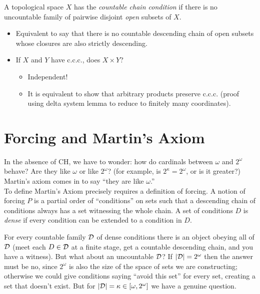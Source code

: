\documentclass{amsart}
\begin{document}
	A topological space $X$ has the \textit{countable chain condition} if there is no uncountable family of pairwise disjoint \textit{open} subsets of $X$.
	
	\begin{itemize}
		\item Equivalent to say that there is no countable descending chain of open subsets whose closures are also strictly descending.
		\item If $X$ and $Y$ have c.c.c., does $X\times Y$?
		\begin{itemize}
			\item Independent!
			\item It is equivalent to show that arbitrary products preserve c.c.c. (proof using delta system lemma to reduce to finitely many coordinates).\\
		\end{itemize}
	\end{itemize}
	
	\newpage 
	
	\section{Forcing and Martin's Axiom}
	
	In the absence of CH, we have to wonder: how do cardinals between $\omega$ and $2^{\omega}$ behave? Are they like $\omega$ or like $2^{\omega}$? (for example, is $2^{\kappa}=2^{\omega}$, or is it greater?) Martin's axiom comes in to say ``they are like $\omega$.''\\
	
	To define Martin's Axiom precisely requires a definition of forcing. A notion of forcing $P$ is a partial order of ``conditions'' on sets such that a descending chain of conditions always has a set witnessing the whole chain. A set of conditions $D$ is \textit{dense} if every condition can be extended to a condition in $D$. 
	
	For every countable family $\mathcal{D}$ of dense conditions there is an object obeying all of $\mathcal{D}$ (meet each $D\in \mathcal{D}$ at a finite stage, get a countable descending chain, and you have a witness). But what about an uncountable $\mathcal{D}$? If $|\mathcal{D}|=2^{\omega}$ then the answer must be no, since $2^{\omega}$ is also the size of the space of sets we are constructing; otherwise we could give conditions saying ``avoid this set'' for every set, creating a set that doesn't exist. But for $|\mathcal{D}|=\kappa \in [\omega,2^{\omega}]$ we have a genuine question.\\
	
\end{document}
